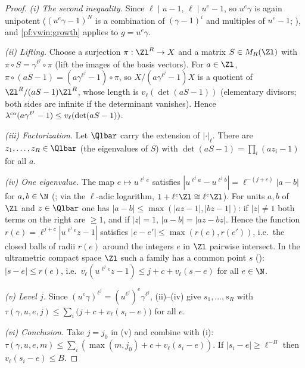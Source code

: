 \begin{proof}
\emph{(i) The second inequality.} Since $\ell\mid u-1$, $\ell\mid u^e-1$, so $u^e\gamma$ is again unipotent
($(u^e\gamma-1)^N$ is a combination of $(\gamma-1)^i$ and multiples of $u^e-1$; ), and
\cref{pf:vwin:growth} applies to $g=u^e\gamma$.

\emph{(ii) Lifting.} Choose a surjection $\pi:\Zl^R\to X$ and a matrix $S\in M_R(\Zl)$ with $\pi\circ S=\gamma^{\ell^j}\circ\pi$
(lift the images of the basis vectors). For $a\in\Zl$, $\pi\circ(aS-1)=(a\gamma^{\ell^j}-1)\circ\pi$, so
$X/(a\gamma^{\ell^j}-1)X$ is a quotient of $\Zl^R/(aS-1)\Zl^R$, whose length is $v_\ell(\det(aS-1))$ (elementary divisors; both
sides are infinite if the determinant vanishes). Hence $\lambda^{\mathrm{co}}(a\gamma^{\ell^j}-1)\le v_\ell(\det(aS-1))$.

\emph{(iii) Factorization.} Let $\Qlbar$ carry the extension of $|\cdot|_\ell$. There are $z_1,\dots,z_R\in\Qlbar$ (the
eigenvalues of $S$) with $\det(aS-1)=\prod_i(az_i-1)$ for all $a$.

\emph{(iv) One eigenvalue.} The map $e\mapsto u^{\ell^je}$ satisfies $|u^{\ell^ja}-u^{\ell^jb}|=\ell^{-(j+c)}|a-b|$ for $a,b\in\N$
(; via the $\ell$-adic logarithm, $1+\ell^c\Zl\cong\ell^c\Zl$). For units $a,b$ of $\Zl$ and
$z\in\Qlbar$ one has $|a-b|\le\max(|az-1|,|bz-1|)$: if $|z|\ne1$ both terms on the right are $\ge1$, and if $|z|=1$,
$|a-b|=|az-bz|$. Hence the function $r(e)=\ell^{j+c}|u^{\ell^je}z-1|$ satisfies $|e-e'|\le\max(r(e),r(e'))$, i.e.\ the closed
balls of radii $r(e)$ around the integers $e$ in $\Zl$ pairwise intersect. In the ultrametric compact space $\Zl$ such a
family has a common point $s$ (): $|s-e|\le r(e)$, i.e.\
$v_\ell(u^{\ell^je}z-1)\le j+c+v_\ell(s-e)$ for all $e\in\N$.

\emph{(v) Level $j$.} Since $(u^e\gamma)^{\ell^j}=(u^{\ell^j})^e\gamma^{\ell^j}$, (ii)--(iv) give $s_1,\dots,s_R$ with
$\tau(\gamma,u,e,j)\le\sum_i\bigl(j+c+v_\ell(s_i-e)\bigr)$ for all $e$.

\emph{(vi) Conclusion.} Take $j=j_0$ in (v) and combine with (i): $\tau(\gamma,u,e,m)\le\sum_i(\max(m,j_0)+c+v_\ell(s_i-e))$.
If $|s_i-e|\ge\ell^{-B}$ then $v_\ell(s_i-e)\le B$.
\end{proof}

